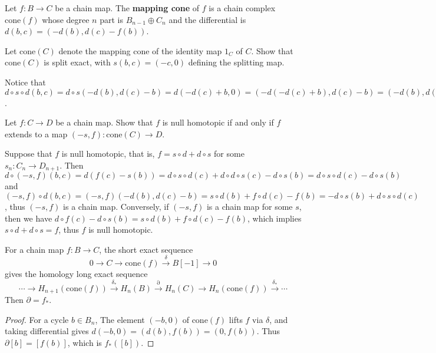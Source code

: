 \begin{defn} Let $f:B\rightarrow C$ be a chain map. The \textbf{mapping cone} of $f$ is a chain complex $\textrm{cone}(f)$ whose degree $n$ part is $B_{n-1}\oplus C_n$ and the differential is $d(b,c)=(-d(b),d(c)-f(b))$.
\end{defn}

\begin{exer} Let $\textrm{cone}(C)$ denote the mapping cone of the identity map $1_C$ of $C$. Show that $\textrm{cone}(C)$ is split exact, with $s(b,c)=(-c,0)$ defining the splitting map.
\end{exer}
\begin{solution} Notice that $d\circ s\circ d(b,c)=d\circ s(-d(b),d(c)-b)=d(-d(c)+b,0)=(-d(-d(c)+b),d(c)-b)=(-d(b),d(c)-b)=d(b,c)$.
\end{solution}

\begin{exer} Let $f:C\rightarrow D$ be a chain map. Show that $f$ is null homotopic if and only if $f$ extends to a map $(-s,f):\textrm{cone}(C)\rightarrow D$.
\end{exer}
\begin{solution} Suppose that $f$ is null homotopic, that is, $f=s\circ d+d\circ s$ for some $s_n:C_n\rightarrow D_{n+1}$. Then $d\circ (-s,f)(b,c)=d(f(c)-s(b))=d\circ s\circ d(c)+d\circ d\circ s(c)-d\circ s(b)=d\circ s\circ d(c)-d\circ s(b)$ and $(-s,f)\circ d(b,c)=(-s,f)(-d(b),d(c)-b)=s\circ d(b)+f\circ d(c)-f(b)=-d\circ s(b)+d\circ s\circ d(c)$, thus $(-s,f)$ is a chain map. Conversely, if $(-s,f)$ is a chain map for some $s$, then we have $d\circ f(c)-d\circ s(b)=s\circ d(b)+f\circ d(c)-f(b)$, which implies $s\circ d+d\circ s=f$, thus $f$ is null homotopic.
\end{solution}

\begin{lemma} For a chain map $f:B\rightarrow C$, the short exact sequence
\begin{equation}
0\rightarrow C\rightarrow \textrm{cone}(f)\xrightarrow{\delta} B[-1]\rightarrow 0
\end{equation}
gives the homology long exact sequence
\begin{equation}
\cdots\rightarrow H_{n+1}(\textrm{cone}(f))\xrightarrow{\delta_*} H_n(B)\xrightarrow{\partial} H_n(C)\rightarrow H_n(\textrm{cone}(f))\xrightarrow{\delta_*}\cdots
\end{equation}
Then $\partial=f_*$.
\end{lemma}
\begin{proof}
For a cycle $b\in B_n$, The element $(-b,0)$ of $\textrm{cone}(f)$ lifts $f$ via $\delta$, and taking differential gives $d(-b,0)=(d(b),f(b))=(0,f(b))$. Thus $\partial[b]=[f(b)]$, which is $f_*([b])$.
\end{proof}

